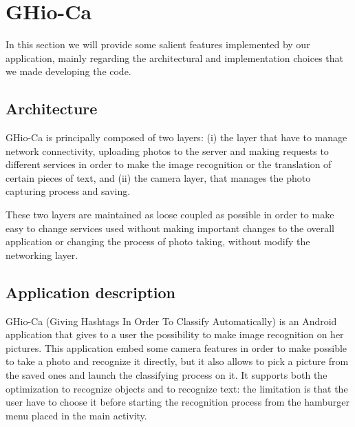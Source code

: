 \section{GHio-Ca}
In this section we will provide some salient features implemented by our 
application, mainly regarding the architectural and implementation choices that 
we made developing the code.

\subsection{Architecture}
GHio-Ca is principally composed of two layers: (i) the layer that have to manage
network connectivity, uploading photos to the server and making requests to 
different services in order to make the image recognition or the translation of 
certain pieces of text, and (ii) the camera layer, that manages the photo 
capturing process and saving. 

These two layers are maintained as loose coupled as possible in order to make 
easy to change services used without making important changes to the overall 
application or changing the process of photo taking, without modify the 
networking layer.

%		

\subsection{Application description}
GHio-Ca (Giving Hashtags In Order To Classify Automatically) is an Android 
application that gives to a user the possibility to make image recognition on 
her pictures. This application embed some camera features in order to make 
possible to take a photo and recognize it directly, but it also allows to pick 
a picture from the saved ones and launch the classifying process on it. It 
supports both the optimization to recognize objects and to recognize text: the 
limitation is that the user have to choose it before starting the recognition 
process from the hamburger menu placed in the main activity. 

